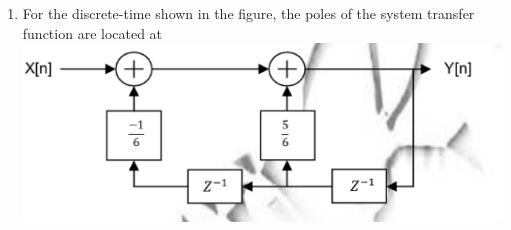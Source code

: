 \documentclass[journal,12pt,twocolumn]{IEEEtran}
\begin{document}
\begin{enumerate}
%
%

\item For the discrete-time shown in the figure, the poles of the system transfer function are located at
\includegraphics[scale=0.3]{fig15.eps}
\begin{enumerate}[(A)]
\end{enumerate}



%
%



\end{enumerate}
\end{document}
